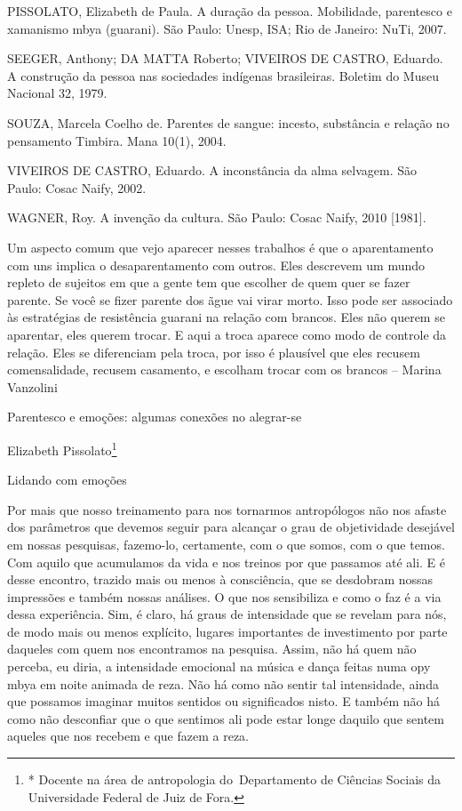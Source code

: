 \documentclass{article}
\begin{document}
PISSOLATO, Elizabeth de Paula. A dura\c{c}\~ao da pessoa. Mobilidade,
parentesco e xamanismo mbya (guarani). S\~ao Paulo: Unesp, ISA; Rio de
Janeiro: NuTi, 2007.

SEEGER, Anthony; DA MATTA Roberto; VIVEIROS DE CASTRO, Eduardo. A
constru\c{c}\~ao da pessoa nas sociedades ind\'igenas brasileiras.
Boletim do Museu Nacional 32, 1979. 

SOUZA, Marcela Coelho de. Parentes de sangue: incesto, subst\^ancia e
rela\c{c}\~ao no pensamento Timbira. Mana 10(1), 2004.

VIVEIROS DE CASTRO, Eduardo. A inconst\^ancia da alma selvagem. S\~ao
Paulo: Cosac Naify, 2002.

WAGNER, Roy. A inven\c{c}\~ao da cultura. S\~ao Paulo: Cosac Naify, 2010
[1981].

Um aspecto comum que vejo aparecer nesses trabalhos \'e que o
aparentamento com uns implica o desaparentamento com outros. Eles
descrevem um mundo repleto de sujeitos em que a gente tem que escolher
de quem quer se fazer parente. Se voc\^e se fizer parente dos \~ague
vai virar morto. Isso pode ser associado \`as estrat\'egias de
resist\^encia guarani na rela\c{c}\~ao com brancos. Eles n\~ao querem
se aparentar, eles querem trocar. E aqui a troca aparece como modo de
controle da rela\c{c}\~ao. Eles se diferenciam pela troca, por isso \'e
plaus\'ivel que eles recusem comensalidade, recusem casamento, e
escolham trocar com os brancos -- Marina Vanzolini

Parentesco e emo\c{c}\~oes: algumas conex\~oes no alegrar-se

Elizabeth Pissolato\footnote{* Docente na \'area de antropologia
do~Departamento de Ci\^encias Sociais da Universidade Federal de Juiz
de Fora.}

Lidando com emo\c{c}\~oes

Por mais que nosso treinamento para nos tornarmos antrop\'ologos n\~ao
nos afaste dos par\^ametros que devemos seguir para alcan\c{c}ar o grau
de objetividade desej\'avel em nossas pesquisas, fazemo-lo, certamente,
com o que somos, com o que temos. Com aquilo que acumulamos da vida e
nos treinos por que passamos at\'e ali. E \'e desse encontro, trazido
mais ou menos \`a consci\^encia, que se desdobram nossas impress\~oes e
tamb\'em nossas an\'alises. O que nos sensibiliza e como o faz \'e a
via dessa experi\^encia. Sim, \'e claro, h\'a graus de intensidade que
se revelam para n\'os, de modo mais ou menos expl\'icito, lugares
importantes de investimento por parte daqueles com quem nos encontramos
na pesquisa. Assim, n\~ao h\'a quem n\~ao perceba, eu diria, a
intensidade emocional na m\'usica e dan\c{c}a feitas numa opy mbya em
noite animada de reza. N\~ao h\'a como n\~ao sentir tal intensidade,
ainda que possamos imaginar muitos sentidos ou significados nisto. E
tamb\'em n\~ao h\'a como n\~ao desconfiar que o que sentimos ali pode
estar longe daquilo que sentem aqueles que nos recebem e que fazem a
reza.
\end{document}

